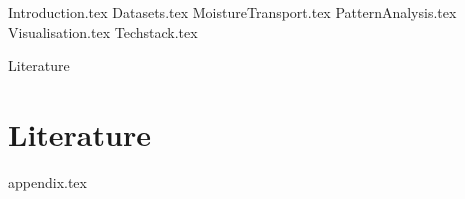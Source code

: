 \documentclass[aspectratio=169]{beamer}
\begin{document}
\maketitlepage %

{Introduction.tex}
{Datasets.tex}
{MoistureTransport.tex}
{PatternAnalysis.tex}
{Visualisation.tex}
{Techstack.tex}

\begin{frame}[allowframebreaks]{Literature}
\section{Literature}
\printbibliography
\end{frame}
{appendix.tex}
\end{document}
